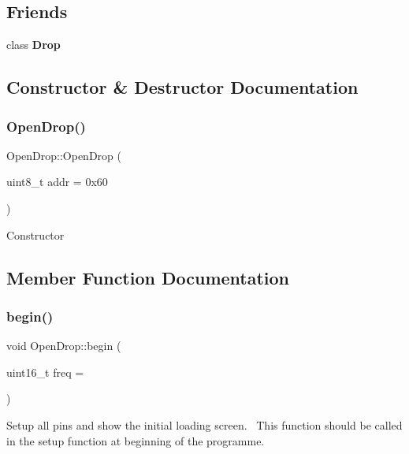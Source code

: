 \subsection*{Friends}
\begin{DoxyCompactItemize}
\item 
\mbox{\label{class_open_drop_ad9604a1a8e4484b9414e946d27245c74}} 
class {\bfseries Drop}
\end{DoxyCompactItemize}


\subsection{Constructor \& Destructor Documentation}
\mbox{\label{class_open_drop_a788cd7194b7248a39453ab99168639ec}} 
\subsubsection{\texorpdfstring{Open\+Drop()}{OpenDrop()}}
{\footnotesize\ttfamily Open\+Drop\+::\+Open\+Drop (\begin{DoxyParamCaption}\item[{uint8\+\_\+t}]{addr = {\ttfamily 0x60} }\end{DoxyParamCaption})}

Constructor 

\subsection{Member Function Documentation}
\mbox{\label{class_open_drop_a22211279e88f493dc8fa56248cf74bd1}} 
\subsubsection{\texorpdfstring{begin()}{begin()}}
{\footnotesize\ttfamily void Open\+Drop\+::begin (\begin{DoxyParamCaption}\item[{uint16\+\_\+t}]{freq = {} }\end{DoxyParamCaption})}

Setup all pins and show the initial loading screen.~\newline
This function should be called in the setup function at beginning of the programme.   \mbox{\label{class_open_drop_a45775dc543679acd609ad58da6a79db0}} 
